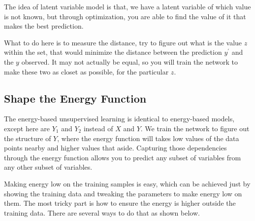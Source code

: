 The idea of latent variable model is that, we have a latent variable of which value is not known, but through optimization, you are able to find the value of it that makes the best prediction.

What to do here is to measure the distance, try to figure out what is the value $z$ within the set, that would minimize the distance between the prediction $y^\prime$ and the $y$ observed. It may not actually be equal, so you will train the network to make these two as closet as possible, for the particular $z$.

\subsection{Shape the Energy Function}

The energy-based unsupervised learning is identical to energy-based models, except here are $Y_1$ and $Y_2$ instead of $X$ and $Y$. We train the network to figure out the structure of $Y$, where the energy function will takes low values of the data points nearby and higher values that aside. Capturing those dependencies through the energy function allows you to predict any subset of variables from any other subset of variables.

Making energy low on the training samples is easy, which can be achieved just by showing the training data and tweaking the parameters to make energy low on them. The most tricky part is how to ensure the energy is higher outside the training data. There are several ways to do that as shown below.

